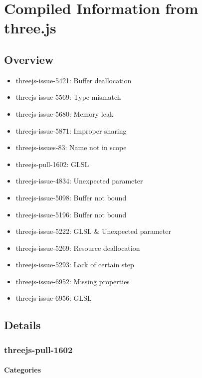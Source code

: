 \section{Compiled Information from
three.js}\label{compiled-information-from-three.js}

\subsection{Overview}\label{overview}

\begin{itemize}
\tightlist
\item
  threejs-issue-5421: Buffer deallocation
\item
  threejs-issue-5569: Type mismatch
\item
  threejs-issue-5680: Memory leak
\item
  threejs-issue-5871: Improper sharing
\item
  threejs-issues-83: Name not in scope
\item
  threejs-pull-1602: GLSL
\item
  threejs-issue-4834: Unexpected parameter
\item
  threejs-issue-5098: Buffer not bound
\item
  threejs-issue-5196: Buffer not bound
\item
  threejs-issue-5222: GLSL \& Unexpected parameter
\item
  threejs-issue-5269: Resource deallocation
\item
  threejs-issue-5293: Lack of certain step
\item
  threejs-issue-6952: Missing properties
\item
  threejs-issue-6956: GLSL
\end{itemize}

\subsection{Details}\label{details}

\subsubsection{threejs-pull-1602}\label{threejs-pull-1602}

\paragraph{Categories}\label{categories}

